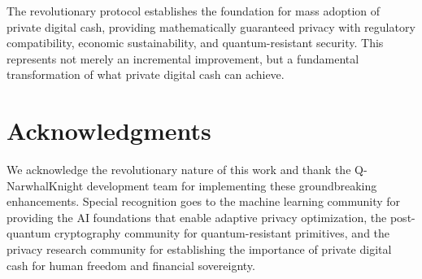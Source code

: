 \documentclass[12pt,a4paper]{article}
\begin{document}
The revolutionary protocol establishes the foundation for mass adoption of private digital cash, providing mathematically guaranteed privacy with regulatory compatibility, economic sustainability, and quantum-resistant security. This represents not merely an incremental improvement, but a fundamental transformation of what private digital cash can achieve.

\section*{Acknowledgments}

We acknowledge the revolutionary nature of this work and thank the Q-NarwhalKnight development team for implementing these groundbreaking enhancements. Special recognition goes to the machine learning community for providing the AI foundations that enable adaptive privacy optimization, the post-quantum cryptography community for quantum-resistant primitives, and the privacy research community for establishing the importance of private digital cash for human freedom and financial sovereignty.
\end{document}
